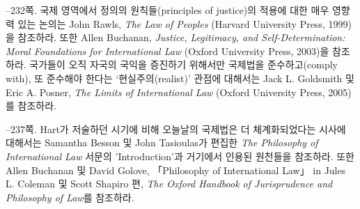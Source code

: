 {--232쪽.  국제
영역에서 정의의 원칙들(principles of justice)의 적용에 대한 매우 영향력
있는 논의는 John Rawls, \emph{The Law of Peoples} (Harvard University
Press, 1999)을 참조하라. 또한 Allen Buchanan, \emph{Justice, Legitimacy,
and Self-Determination: Moral Foundations for International Law} (Oxford
University Press, 2003)을 참조하라. 국가들이 오직 자국의 국익을 증진하기
위해서만 국제법을 준수하고(comply with), 또 준수해야 한다는
‘현실주의(realist)’ 관점에 대해서는 Jack L. Goldsmith 및 Eric A. Posner,
\emph{The Limits of International Law} (Oxford University Press, 2005)를
참조하라.

--237쪽.  Hart가 저술하던 시기에 비해 오늘날의 국제법은 더 체계화되었다는 시사에
대해서는 Samantha Besson 및 John Tasioulas가 편집한 \emph{The Philosophy
of International Law} 서문의 'Introduction'과 거기에서 인용된 원천들을
참조하라. 또한 Allen Buchanan 및 David Golove, 「Philosophy of
International Law」 in Jules L. Coleman 및 Scott Shapiro 편, \emph{The
Oxford Handbook of Jurisprudence and Philosophy of Law}를 참조하라.
}
